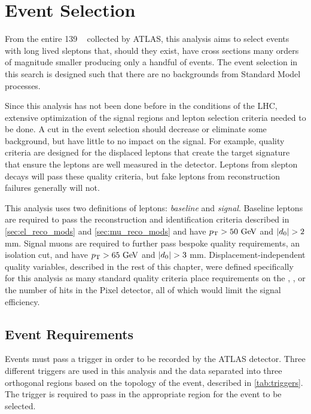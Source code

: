 \chapter{Event Selection}
\label{chap:event-selection}

From the entire 139 \ifb~ collected by \ac{ATLAS}, this analysis aims to select events with long lived sleptons that, should they exist, have cross sections many orders of magnitude smaller producing only a handful of events. The event selection in this search is designed such that there are no backgrounds from Standard Model processes.

Since this analysis has not been done before in the conditions of the \ac{LHC}, extensive optimization of the signal regions and lepton selection criteria needed to be done. A cut in the event selection should decrease or eliminate some background, but have little to no impact on the signal. For example, quality criteria are designed for the displaced leptons that create the target signature that ensure the leptons are well measured in the detector. Leptons from slepton decays will pass these quality criteria, but fake leptons from reconstruction failures generally will not.

This analysis uses two definitions of leptons: \emph{baseline} and \emph{signal}. Baseline leptons are required to pass the reconstruction and identification criteria described in \autoref{sec:el_reco_mods} and \autoref{sec:mu_reco_mods} and have $\pt > 50 \GeV$ and $|d_0| > 2$ mm. Signal muons are required to further pass bespoke quality requirements, an isolation cut, and have $\pt > 65 \GeV$ and $|d_0| > 3$ mm. Displacement-independent quality variables, described in the rest of this chapter, were defined specifically for this analysis as many standard quality criteria place requirements on the \absdz, \absz, or the number of hits in the Pixel detector, all of which would limit the signal efficiency.

\section{Event Requirements}

Events must pass a trigger in order to be recorded by the \ac{ATLAS} detector. Three different triggers are used in this analysis and the data separated into three orthogonal regions based on the topology of the event, described in \autoref{tab:triggers}. The trigger is required to pass in the appropriate region for the event to be selected.

